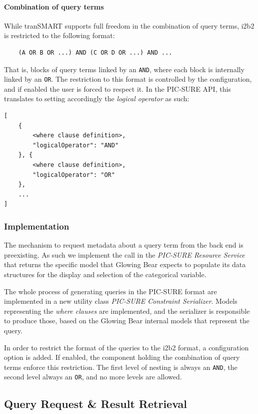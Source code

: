 \paragraph{Combination of query terms}
While tranSMART supports full freedom in the combination of query terms, i2b2 is restricted to the following format:
\begin{verbatim}
    (A OR B OR ...) AND (C OR D OR ...) AND ...
\end{verbatim}
That is, blocks of query terms linked by an \verb|AND|, where each block is internally linked by an \verb|OR|.
The restriction to this format is controlled by the configuration, and if enabled the user is forced to respect it.
In the PIC-SURE API, this translates to setting accordingly the \emph{logical operator} as such:
\begin{samepage}
\begin{verbatim}
[
    { 
        <where clause definition>,
        "logicalOperator": "AND"
    }, {
        <where clause definition>,
        "logicalOperator": "OR"
    },
    ...
]
\end{verbatim}
\end{samepage}


\subsubsection{Implementation}

The mechanism to request metadata about a query term from the back end is preexisting.
As such we implement the call in the \emph{PIC-SURE Resource Service} that returns the specific model that Glowing Bear expects to populate its data structures for the display and selection of the categorical variable.

The whole process of generating queries in the PIC-SURE format are implemented in a new utility class \emph{PIC-SURE Constraint Serializer}.
Models representing the \emph{where clauses} are implemented, and the serializer is responsible to produce those, based on the Glowing Bear internal models that represent the query.

In order to restrict the format of the queries to the i2b2 format, a configuration option is added.
If enabled, the component holding the combination of query terms enforce this restriction.
The first level of nesting is always an \verb|AND|, the second level always an \verb|OR|, and no more levels are allowed.


\subsection{Query Request \& Result Retrieval}
\label{sec:interoplayer-gb-results}

